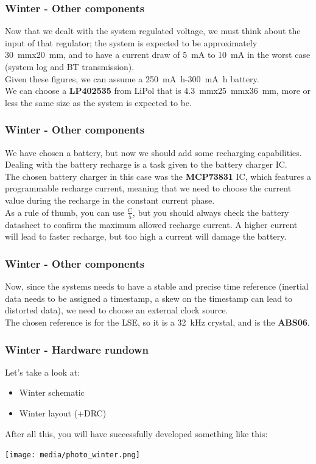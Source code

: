 \documentclass[11pt,xcolor=table,aspectratio=169]{beamer}
\begin{document}
	\begin{frame}
		\frametitle{Winter - Other components}
		Now that we dealt with the system regulated voltage, we must think about the input of that regulator; the system is expected to be approximately \SI{30}{\milli\meter}x\SI{20}{\milli\meter}, and to have a current draw of \SI{5}{\milli\ampere} to \SI{10}{\milli\ampere} in the worst case (system log and BT transmission).\\
		Given these figures, we can assume a \SI{250}{\milli\ampere\hour}-\SI{300}{\milli\ampere\hour} battery.\\
		We can choose a \textbf{LP402535} from LiPol that is \SI{4.3}{\milli\meter}x\SI{25}{\milli\meter}x\SI{36}{\milli\meter}, more or less the same size as the system is expected to be.
	\end{frame}

	\begin{frame}
		\frametitle{Winter - Other components}
		We have chosen a battery, but now we should add some recharging capabilities. Dealing with the battery recharge is a task given to the battery charger IC.\\
		The chosen battery charger in this case was the \textbf{MCP73831} IC, which features a programmable recharge current, meaning that we need to choose the current value during the recharge in the constant current phase.\\
		As a rule of thumb, you can use $\tfrac{C}{5}$, but you should always check the battery datasheet to confirm the maximum allowed recharge current. A higher current will lead to faster recharge, but too high a current will damage the battery.
	\end{frame}

	\begin{frame}
		\frametitle{Winter - Other components}
		Now, since the systems needs to have a stable and precise time reference (inertial data needs to be assigned a timestamp, a skew on the timestamp can lead to distorted data), we need to choose an external clock source.\\
		The chosen reference is for the LSE, so it is a \SI{32}{\kilo\hertz} crystal, and is the \textbf{ABS06}. 
	\end{frame}

	\begin{frame}
		\frametitle{Winter - Hardware rundown}
		Let's take a look at:
		\begin{itemize}
			\item Winter schematic
			\item Winter layout (+DRC)
		\end{itemize}
		After all this, you will have successfully developed something like this:
		\begin{center}
			\texttt{[image: media/photo\_winter.png]}
		\end{center}
	\end{frame}
\end{document}

